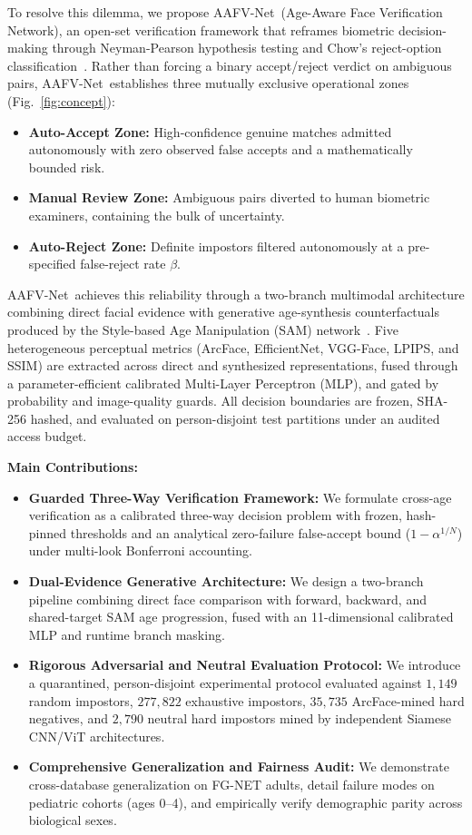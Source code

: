 \documentclass[10pt,journal,compsoc]{IEEEtran}
\newcommand{\sys}{AAFV-Net}
\begin{document}
To resolve this dilemma, we propose \sys\ (Age-Aware Face Verification Network), an open-set verification framework that reframes biometric decision-making through Neyman-Pearson hypothesis testing and Chow's reject-option classification~\cite{chow1970reject}. Rather than forcing a binary accept/reject verdict on ambiguous pairs, \sys\ establishes three mutually exclusive operational zones (Fig.~\ref{fig:concept}):
\begin{itemize}
    \item \textbf{Auto-Accept Zone:} High-confidence genuine matches admitted autonomously with zero observed false accepts and a mathematically bounded risk.
    \item \textbf{Manual Review Zone:} Ambiguous pairs diverted to human biometric examiners, containing the bulk of uncertainty.
    \item \textbf{Auto-Reject Zone:} Definite impostors filtered autonomously at a pre-specified false-reject rate $\beta$.
\end{itemize}

\sys\ achieves this reliability through a two-branch multimodal architecture combining direct facial evidence with generative age-synthesis counterfactuals produced by the Style-based Age Manipulation (SAM) network~\cite{alaluf2021sam}. Five heterogeneous perceptual metrics (ArcFace, EfficientNet, VGG-Face, LPIPS, and SSIM) are extracted across direct and synthesized representations, fused through a parameter-efficient calibrated Multi-Layer Perceptron (MLP), and gated by probability and image-quality guards. All decision boundaries are frozen, SHA-256 hashed, and evaluated on person-disjoint test partitions under an audited access budget.

\textbf{Main Contributions:}
\begin{itemize}
    \item \textbf{Guarded Three-Way Verification Framework:} We formulate cross-age verification as a calibrated three-way decision problem with frozen, hash-pinned thresholds and an analytical zero-failure false-accept bound ($1 - \alpha^{1/N}$) under multi-look Bonferroni accounting.
    \item \textbf{Dual-Evidence Generative Architecture:} We design a two-branch pipeline combining direct face comparison with forward, backward, and shared-target SAM age progression, fused with an 11-dimensional calibrated MLP and runtime branch masking.
    \item \textbf{Rigorous Adversarial and Neutral Evaluation Protocol:} We introduce a quarantined, person-disjoint experimental protocol evaluated against $1{,}149$ random impostors, $277{,}822$ exhaustive impostors, $35{,}735$ ArcFace-mined hard negatives, and $2{,}790$ neutral hard impostors mined by independent Siamese CNN/ViT architectures.
    \item \textbf{Comprehensive Generalization and Fairness Audit:} We demonstrate cross-database generalization on FG-NET adults, detail failure modes on pediatric cohorts (ages 0--4), and empirically verify demographic parity across biological sexes.
\end{itemize}
\end{document}
